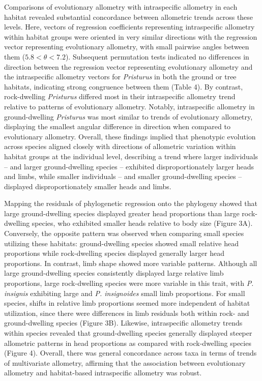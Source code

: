 \documentclass[
  11pt,
]{article}
\begin{document}
Comparisons of evolutionary allometry with intraspecific allometry in
each habitat revealed substantial concordance between allometric trends
across these levels. Here, vectors of regression coefficients
representing intraspecific allometry within habitat groups were oriented
in very similar directions with the regression vector representing
evolutionary allometry, with small pairwise angles between them
(\(5.8 <\theta < 7.2\)). Subsequent permutation tests indicated no
differences in direction between the regression vector representing
evolutionary allometry and the intraspecific allometry vectors for
\emph{Pristurus} in both the ground or tree habitats, indicating strong
congruence between them (Table 4). By contrast, rock-dwelling
\emph{Pristurus} differed most in their intraspecific allometry trend
relative to patterns of evolutionary allometry. Notably, intraspecific
allometry in ground-dwelling \emph{Pristurus} was most similar to trends
of evolutionary allometry, displaying the smallest angular difference in
direction when compared to evolutionary allometry. Overall, these
findings implied that phenotypic evolution across species aligned
closely with directions of allometric variation within habitat groups at
the individual level, describing a trend where larger individuals -- and
larger ground-dwelling species -- exhibited disproportionately larger
heads and limbs, while smaller individuals -- and smaller
ground-dwelling species -- displayed disproportionately smaller heads
and limbs. \hfill\break

Mapping the residuals of phylogenetic regression onto the phylogeny
showed that large ground-dwelling species displayed greater head
proportions than large rock-dwelling species, who exhibited smaller
heads relative to body size (Figure 3A). Conversely, the opposite
pattern was observed when comparing small species utilizing these
habitats: ground-dwelling species showed small relative head proportions
while rock-dwelling species displayed generally larger head proportions.
In contrast, limb shape showed more variable patterns. Although all
large ground-dwelling species consistently displayed large relative limb
proportions, large rock-dwelling species were more variable in this
trait, with \emph{P. insignis} exhibiting large and \emph{P.
insignoides} small limb proportions. For small species, shifts in
relative limb proportions seemed more independent of habitat
utilization, since there were differences in limb residuals both within
rock- and ground-dwelling species (Figure 3B). Likewise, intraspecific
allometry trends within species revealed that ground-dwelling species
generally displayed steeper allometric patterns in head proportions as
compared with rock-dwelling species (Figure 4). Overall, there was
general concordance across taxa in terms of trends of multivariate
allometry, affirming that the association between evolutionary allometry
and habitat-based intraspecific allometry was robust. \hfill\break
\end{document}
